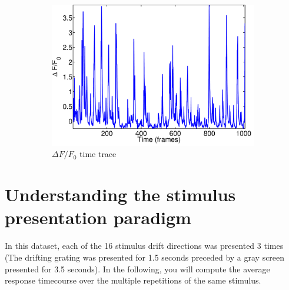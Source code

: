 \documentclass[paper=a4, fontsize=11pt]{scrartcl} %
\numberwithin{equation}{section} %
\numberwithin{figure}{section} %
\numberwithin{table}{section} %
\begin{document}
\begin{figure}
\begin{subfigure}[b]{0.3\textwidth}
    \includegraphics[width=\textwidth]{trace_delta_f_f0.pdf}
    \caption{$\Delta F/F_0$ time trace}
    \label{fig:time_trace_dff0}
    \end{subfigure}
    
    \caption{}
\end{figure}


\section{Understanding the stimulus presentation paradigm}

In this dataset, each of the 16 stimulus drift directions was presented 3 times (The drifting grating was presented for 1.5 seconds preceded by a gray screen presented for 3.5 seconds).
In the following, you will compute the average response timecourse over the multiple repetitions of the same stimulus.
\end{document}
